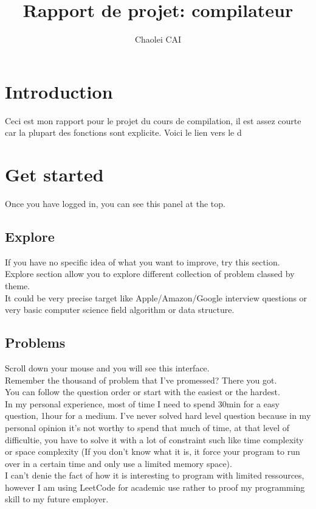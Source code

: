 \documentclass[12pt, letterpaper]{article}
\title{Rapport de projet: compilateur }
\author{Chaolei CAI}
\begin{document}
\begin{titlepage}
    \maketitle
\end{titlepage}

\tableofcontents
\section{Introduction}
Ceci est mon rapport pour le projet du cours de compilation, il est assez courte car la plupart des fonctions sont explicite. 
Voici le lien vers le d

\section{Get started}
Once you have logged in, you can see this panel at the top.\\
\subsection{Explore}
If you have no specific idea of what you want to improve, try this section.\\
Explore section allow you to explore different collection of problem classed by theme.\\
It could be very precise target like Apple/Amazon/Google interview questions or very basic computer science field algorithm or data structure. \\

\subsection{Problems}
Scroll down your mouse and you will see this interface.\\
Remember the thousand of problem that I've promessed? There you got.\\
You can follow the question order or start with the easiest or the hardest.\\
In my personal experience, most of time I need to spend 30min for a easy question,
1hour for a medium. I've never solved hard level question because in my personal opinion it's not worthy to spend that much of time, at that level of difficultie, you have to solve it with a lot of constraint such like time complexity or space complexity (If you don't know what it is, it force your program to run over in a certain time and only use a limited memory space).\\
I can't denie the fact of how it is interesting to program with limited ressources, however I am using LeetCode for academic use rather to proof my programming skill to my future employer.
\end{document}
